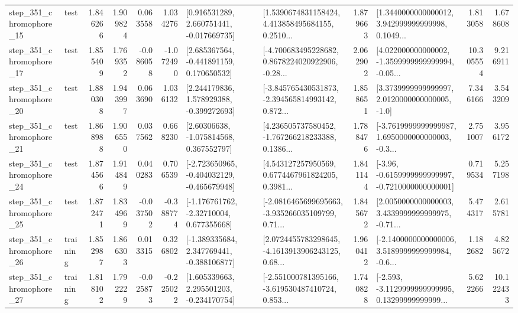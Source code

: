 \begin{tabular}{llrrrrllrlrr}
  step\_351\_chromophore\_15 &      test &      1.846266 &    1.909824 &      0.063558 &  1.034276 &    [0.916531289, 2.660751441, -0.017669735] &  [1.5390674831158424, 4.413858495684155, 0.2510... &       1.879663 &  [1.3440000000000012, 3.942999999999998, 0.1049... &            1.813058 &          1.678608 \\
  step\_351\_chromophore\_17 &      test &      1.855409 &    1.769352 &     -0.086058 & -1.072490 &    [2.685367564, -0.441891159, 0.170650532] &  [-4.700683495228682, 0.8678224020922906, -0.28... &       2.062902 &  [4.022000000000002, -1.3599999999999994, -0.05... &           10.305554 &          9.216911 \\
  step\_351\_chromophore\_20 &      test &      1.880308 &    1.943997 &      0.063690 &  1.036132 &    [2.244179836, 1.578929388, -0.399272693] &  [-3.845765430531873, -2.394565814993142, 0.872... &       1.858651 &     [3.3739999999999997, 2.0120000000000005, -1.0] &            7.346166 &          3.543209 \\
  step\_351\_chromophore\_21 &      test &      1.868988 &    1.906550 &      0.037562 &  0.668230 &     [2.60306638, -1.075814568, 0.367552797] &  [4.236505737580452, -1.767266218233388, 0.1386... &       1.788476 &  [-3.7619999999999987, 1.6950000000000003, -0.3... &            2.751007 &          3.956172 \\
  step\_351\_chromophore\_24 &      test &      1.874566 &    1.914849 &      0.040283 &  0.706539 &  [-2.723650965, -0.404032129, -0.465679948] &  [4.543127257950569, 0.6774467961824205, 0.3981... &       1.841144 &  [-3.96, -0.6159999999999997, -0.7210000000000001] &            0.719534 &          5.257198 \\
  step\_351\_chromophore\_25 &      test &      1.872471 &    1.834969 &     -0.037502 & -0.388774 &    [-1.176761762, -2.32710004, 0.677355668] &  [-2.0816465699695663, -3.935266035109799, 0.71... &       1.845672 &  [2.0050000000000003, 3.4339999999999975, -0.71... &            5.474317 &          2.615781 \\
  step\_351\_chromophore\_26 &  training &      1.852987 &    1.866303 &      0.013315 &  0.326802 &   [-1.389335684, 2.347769441, -0.388106877] &  [2.0724455783298645, -4.1613913906243125, 0.68... &       1.960412 &  [-2.1400000000000006, 3.5189999999999984, -0.6... &            1.182682 &          4.825672 \\
  step\_351\_chromophore\_27 &  training &      1.818102 &    1.792229 &     -0.025873 & -0.225022 &    [1.605339663, 2.295501203, -0.234170754] &  [-2.551000781395166, -3.619530487410724, 0.853... &       1.740828 &  [-2.593, -3.1129999999999995, 0.13299999999999... &            5.622266 &         10.122433 \\

\end{tabular}
